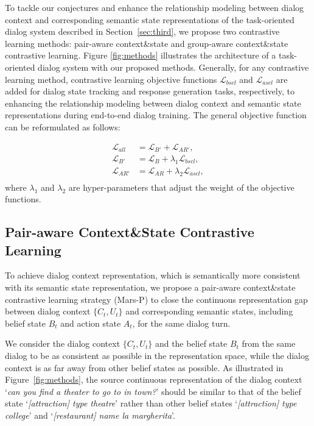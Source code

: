To tackle our conjectures and enhance the relationship modeling between dialog context and corresponding semantic state representations of   the task-oriented dialog system  described in Section~\ref{sec:third}, we propose two contrastive learning methods: pair-aware context\&state and group-aware context\&state  contrastive learning. Figure \ref{fig:methods} illustrates the architecture of a task-oriented dialog system with our  proposed  methods.
Generally, for any contrastive learning method,  contrastive learning objective functions $\mathcal{L}_{bscl}$ and $\mathcal{L}_{ascl}$ are added for dialog state tracking and response generation tasks, respectively, to enhancing the relationship modeling between dialog context and semantic state representations  during end-to-end dialog training. The general objective function can be reformulated as follows:

{\footnotesize
\setlength{\abovedisplayskip}{0.005cm}
\setlength{\belowdisplayskip}{0.005cm}
\begin{equation}
\begin{aligned}
\mathcal{L}_{all} &= \mathcal{L}_{B'} + \mathcal{L}_{AR'},\\
\mathcal{L}_{B'} &= \mathcal{L}_{B} +\lambda_{1}\mathcal{L}_{bscl} ,\\
\mathcal{L}_{AR'} &= \mathcal{L}_{AR} + \lambda_{2}\mathcal{L}_{ascl},\\
\end{aligned}
\end{equation}}%
where $\lambda_{1}$ and $\lambda_{2}$ are hyper-parameters that adjust the weight of the  objective functions.
\subsection{Pair-aware Context\&State Contrastive Learning}
To achieve dialog context representation, which is  semantically more consistent with  its semantic state representation,  we propose a pair-aware context\&state contrastive learning strategy (Mars-P) to close the continuous representation gap between  dialog context $\{C_t,U_t\}$ and corresponding semantic states, including belief state $B_t$  and action state $A_t$, for the same dialog turn.

We consider the dialog context $\{C_t,U_t\}$ and the belief state $B_t$ from the same dialog  to be as consistent as possible in the representation space, while the dialog context is as far away from other belief states as possible.
As illustrated in Figure~\ref{fig:methods}, the source continuous representation of the dialog context `\textit{can you find a theater to go to in town?}' should be similar to that of the belief state `\textit{[attraction] type theatre}' rather than other belief states  `\textit{[attraction] type college}' and `\textit{[restaurant] name la margherita}'.

